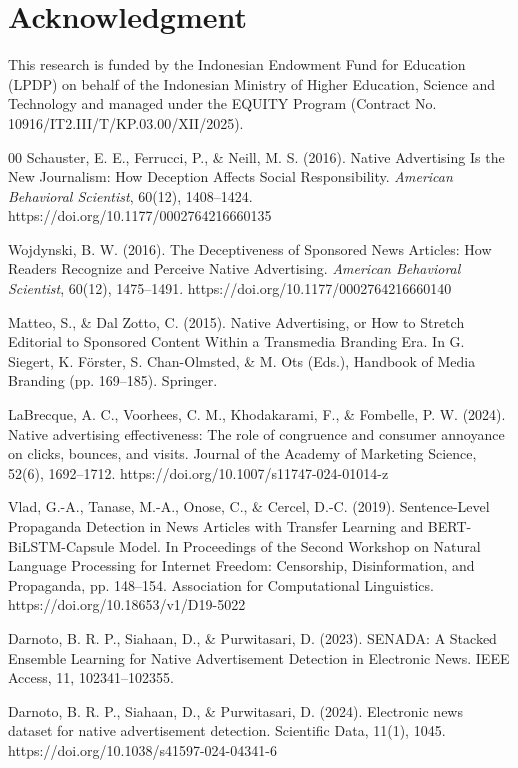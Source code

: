 \documentclass{ieeeaccess}
\begin{document}
\section*{Acknowledgment}
This research is funded by the Indonesian Endowment Fund for Education (LPDP) on behalf of the Indonesian Ministry of Higher Education, Science and Technology and managed under the EQUITY Program (Contract No. 10916/IT2.III/T/KP.03.00/XII/2025).

\begin{thebibliography}{00}
 Schauster, E. E., Ferrucci, P., \& Neill, M. S. (2016). Native Advertising Is the New Journalism: How Deception Affects Social Responsibility. \textit{American Behavioral Scientist}, 60(12), 1408--1424. https://doi.org/10.1177/0002764216660135

 Wojdynski, B. W. (2016). The Deceptiveness of Sponsored News Articles: How Readers Recognize and Perceive Native Advertising. \textit{American Behavioral Scientist}, 60(12), 1475--1491. https://doi.org/10.1177/0002764216660140

 Matteo, S., \& Dal Zotto, C. (2015). Native Advertising, or How to Stretch Editorial to Sponsored Content Within a Transmedia Branding Era. In G. Siegert, K. Förster, S. Chan-Olmsted, \& M. Ots (Eds.), Handbook of Media Branding (pp. 169--185). Springer.

 LaBrecque, A. C., Voorhees, C. M., Khodakarami, F., \& Fombelle, P. W. (2024). Native advertising effectiveness: The role of congruence and consumer annoyance on clicks, bounces, and visits. Journal of the Academy of Marketing Science, 52(6), 1692--1712. https://doi.org/10.1007/s11747-024-01014-z

 Vlad, G.-A., Tanase, M.-A., Onose, C., \& Cercel, D.-C. (2019). Sentence-Level Propaganda Detection in News Articles with Transfer Learning and BERT-BiLSTM-Capsule Model. In Proceedings of the Second Workshop on Natural Language Processing for Internet Freedom: Censorship, Disinformation, and Propaganda, pp. 148--154. Association for Computational Linguistics. https://doi.org/10.18653/v1/D19-5022

 Darnoto, B. R. P., Siahaan, D., \& Purwitasari, D. (2023). SENADA: A Stacked Ensemble Learning for Native Advertisement Detection in Electronic News. IEEE Access, 11, 102341--102355.

 Darnoto, B. R. P., Siahaan, D., \& Purwitasari, D. (2024). Electronic news dataset for native advertisement detection. Scientific Data, 11(1), 1045. https://doi.org/10.1038/s41597-024-04341-6


\end{thebibliography}
\end{document}
